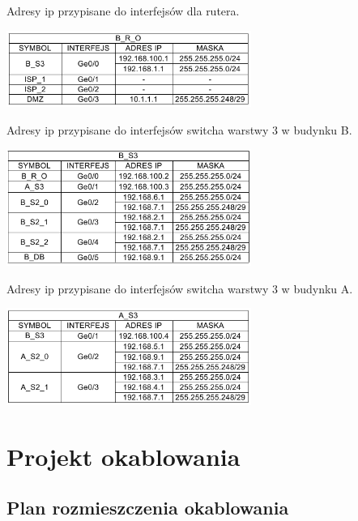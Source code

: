 \documentclass{report}
\begin{document}
\begin{table}[H]
\caption{Adresy ip przypisane do interfejsów dla rutera.}
 \centering
      \includegraphics[width=0.6\textwidth]{./obrazki/ip/br0.png}
\end{table}

\begin{table}[H]
\caption{Adresy ip przypisane do interfejsów switcha warstwy 3 w budynku B.}
 \centering
      \includegraphics[width=0.6\textwidth]{./obrazki/ip/bs3.png}
\end{table}

\begin{table}[H]
\caption{Adresy ip przypisane do interfejsów switcha warstwy 3 w budynku A.}
 \centering
      \includegraphics[width=0.6\textwidth]{./obrazki/ip/as3.png}
\end{table}

\section{Projekt okablowania}

\subsection{Plan rozmieszczenia okablowania}
\end{document}
